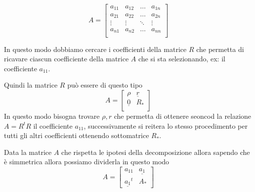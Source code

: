 \begin{equation*}
    A=\left[\begin{array}{c|ccc}
        a_{11}&a_{12} & \dots & a_{1n}\\
        \hline
        a_{21}&a_{22} & \dots & a_{2n}\\
        \vdots&\vdots & \ddots & \vdots\\
        a_{n1}&a_{n2} & \dots & a_{nn}\\
    \end{array}\right]
\end{equation*}

In questo modo dobbiamo cercare i coefficienti della matrice $R$ che permetta di 
ricavare ciascun coefficiente della matrice $A$ che si sta selezionando,
ex: il coefficiente $a_{11}$.

Quindi la matrice $R$ può essere di questo tipo
\begin{equation*}
    A=\left[\begin{array}{c|c}
        \rho &\underline{r}\\
        \hline
        \underline{0}&R_\ast\\
    \end{array}\right]
\end{equation*}
In questo modo bisogna trovare $\rho, r$ che permetta di ottenere seoncod la 
relazione $A=R^tR$ il coefficiente $a_{11}$, successivamente si reitera lo stesso 
procedimento per tutti gli altri coefficienti ottenendo sottomatrice $R_\ast$.

Data la matrice $A$ che rispetta le ipotesi della decomposizione allora sapendo che 
è simmetrica allora possiamo dividerla in questo modo
\begin{equation*}
    A=\left[\begin{array}{c|ccc}
        a_{11}&\underline{a_1}\\
        \hline
        \underline{a_1}^t & A_\ast
    \end{array}\right]
\end{equation*} 

